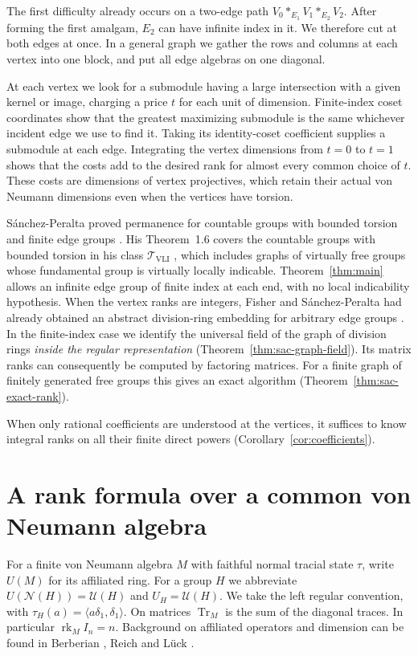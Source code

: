 \documentclass[11pt,a4paper,reqno]{amsart}
\numberwithin{equation}{section}
\theoremstyle{remark}
\newcommand{\N}{\mathcal N}
\newcommand{\U}{\mathcal U}
\newcommand{\Tr}{\operatorname{Tr}}
\newcommand{\rk}{\operatorname{rk}}
\begin{document}
The first difficulty already occurs on a two-edge path \(V_0*_{E_1}V_1*_{E_2}V_2\). After forming the first amalgam, \(E_2\) can have infinite index in it. We therefore cut at both edges at once. In a general graph we gather the rows and columns at each vertex into one block, and put all edge algebras on one diagonal.

At each vertex we look for a submodule having a large intersection with a given kernel or image, charging a price \(t\) for each unit of dimension. Finite-index coset coordinates show that the greatest maximizing submodule is the same whichever incident edge we use to find it. Taking its identity-coset coefficient supplies a submodule at each edge. Integrating the vertex dimensions from \(t=0\) to \(t=1\) shows that the costs add to the desired rank for almost every common choice of \(t\). These costs are dimensions of vertex projectives, which retain their actual von Neumann dimensions even when the vertices have torsion.

S\'anchez-Peralta proved permanence for countable groups with bounded torsion and finite edge groups \cite[Theorem~1.1]{Sanchez}. His Theorem~1.6 covers the countable groups with bounded torsion in his class \(\mathcal T_{\mathrm{VLI}}\) \cite[Definition~1.5 and the paragraph after it]{Sanchez}, which includes graphs of virtually free groups whose fundamental group is virtually locally indicable. Theorem~\ref{thm:main} allows an infinite edge group of finite index at each end, with no local indicability hypothesis. When the vertex ranks are integers, Fisher and S\'anchez-Peralta had already obtained an abstract division-ring embedding for arbitrary edge groups \cite[Corollary~3.12]{FSP}. In the finite-index case we identify the universal field of the graph of division rings \emph{inside the regular representation} (Theorem~\ref{thm:sac-graph-field}). Its matrix ranks can consequently be computed by factoring matrices. For a finite graph of finitely generated free groups this gives an exact algorithm (Theorem~\ref{thm:sac-exact-rank}).

When only rational coefficients are understood at the vertices, it suffices to know integral ranks on all their finite direct powers (Corollary~\ref{cor:coefficients}).

\section{A rank formula over a common von Neumann algebra}\label{sec:analytic}\label{sec:modules}
For a finite von Neumann algebra \(M\) with faithful normal tracial state \(\tau\), write \(U(M)\) for its affiliated ring. For a group \(H\) we abbreviate \(U(\N(H))=\U(H)\) and \(U_H=\U(H)\). We take the left regular convention, with \(\tau_H(a)=\langle a\delta_1,\delta_1\rangle\). On matrices \(\Tr_M\) is the sum of the diagonal traces. In particular \(\rk_M I_n=n\). Background on affiliated operators and dimension can be found in Berberian \cite{Berberian}, Reich \cite{Reich} and L\"uck \cite[Chapters~6 and~8]{Luck}.
\end{document}
